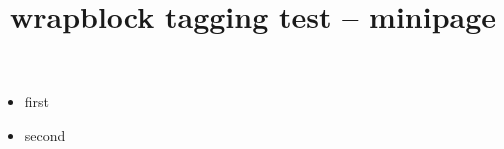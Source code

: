 \documentclass{article}
\title{wrapblock tagging test -- minipage}
\begin{document}
\kant[1]
\begin{wrapblock}{%
  \begin{minipage}{0.3\textwidth}
  \kant[5][1]
  \end{minipage}}
\kant[2-3]
\end{wrapblock}
\kant[4]

\kant[1]
\begin{wrapblock}{%
  \begin{minipage}{0.3\textwidth}
  \begin{itemize}
  \item first
  \item second
  \end{itemize}
  \end{minipage}}
\kant[2-3]
\end{wrapblock}
\kant[4]
\end{document}
